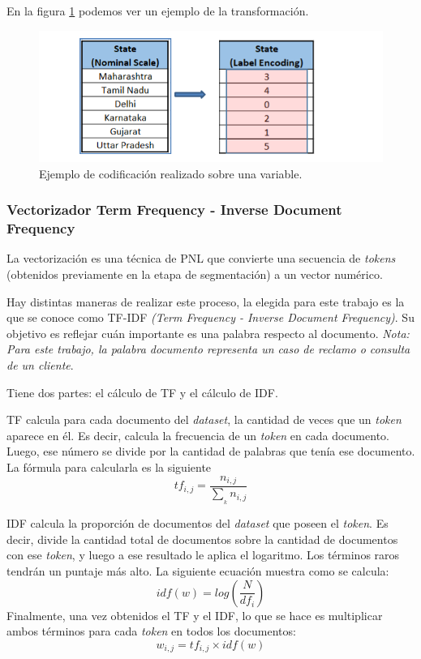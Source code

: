 En la figura \ref{fig:labelencoding} podemos ver un ejemplo de la transformación.

\begin{figure}[htbp]
	\centering
	\includegraphics[width=.8\textwidth]{./Figures/labelencoding.png}
	\caption{Ejemplo de codificación realizado sobre una variable\protect\footnotemark.}
	\label{fig:labelencoding}
\end{figure}


\subsubsection{Vectorizador Term Frequency - Inverse Document Frequency}

La vectorización es una técnica de PNL que convierte una secuencia de \textit{tokens} (obtenidos previamente en la etapa de segmentación) a un vector numérico.

Hay distintas maneras de realizar este proceso, la elegida para este trabajo es la que se conoce como TF-IDF \textit{(Term Frequency - Inverse Document Frequency)}. Su objetivo es reflejar cuán importante es una palabra respecto al documento. \textit{Nota: Para este trabajo, la palabra documento representa un caso de reclamo o consulta de un cliente}. 

Tiene dos partes: el cálculo de TF y el cálculo de IDF.

TF calcula para cada documento del \textit{dataset}, la cantidad de veces que un \textit{token} aparece en él. Es decir, calcula la frecuencia de un \textit{token} en cada documento. Luego, ese número se divide por la cantidad de palabras que tenía ese documento. 
La fórmula para calcularla es la siguiente \citep{WEBSITE:17}
\begin{equation}
tf_{i,j}= \frac{n_{i,j}}{\sum_{_{k}}^{}n_{i,j}}
\end{equation}

IDF calcula la proporción de documentos del \textit{dataset} que poseen el \textit{token}. Es decir, divide la cantidad total de documentos sobre la cantidad de documentos con ese \textit{token}, y luego a ese resultado le aplica el logaritmo. Los términos raros tendrán un puntaje más alto. 
La siguiente ecuación muestra como se calcula:
\begin{equation}
idf(w) = log(\frac{N}{df_{i}})
\end{equation}
Finalmente, una vez obtenidos el TF y el IDF, lo que se hace es multiplicar ambos términos para cada \textit{token} en todos los documentos:
\begin{equation}
w_{i,j} = tf_{i,j} \times idf(w)
\end{equation}

